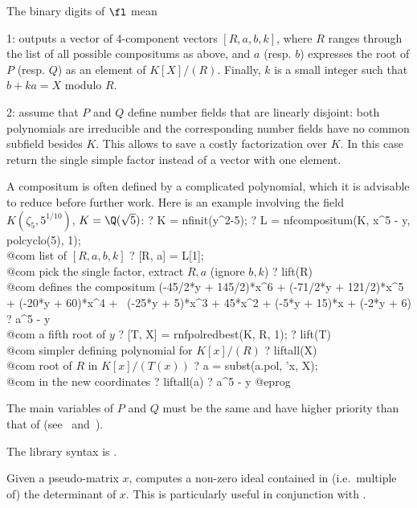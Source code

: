 The binary digits of $\fl$ mean

1: outputs a vector of 4-component vectors $[R,a,b,k]$, where $R$
ranges through the list of all possible compositums as above, and $a$
(resp. $b$) expresses the root of $P$ (resp. $Q$) as an element of
$K[X]/(R)$. Finally, $k$ is a small integer such that $b + ka = X$ modulo
$R$.

2: assume that $P$ and $Q$ define number fields that are linearly disjoint:
both polynomials are irreducible and the corresponding number fields
have no common subfield besides $K$. This allows to save a costly
factorization over $K$. In this case return the single simple factor
instead of a vector with one element.

A compositum is often defined by a complicated polynomial, which it is
advisable to reduce before further work. Here is an example involving
the field $K(\zeta_5, 5^{1/10})$, $K=\Q(\sqrt{5})$:
\bprog
? K = nfinit(y^2-5);
? L = nfcompositum(K, x^5 - y, polcyclo(5), 1); \\@com list of $[R,a,b,k]$
? [R, a] = L[1];  \\@com pick the single factor, extract $R,a$ (ignore $b,k$)
? lift(R)         \\@com defines the compositum
(-45/2*y + 145/2)*x^6 + (-71/2*y + 121/2)*x^5 + (-20*y + 60)*x^4 +    \
(-25*y + 5)*x^3 + 45*x^2 + (-5*y + 15)*x + (-2*y + 6)
? a^5 - y         \\@com a fifth root of $y$
? [T, X] = rnfpolredbest(K, R, 1);
? lift(T)     \\@com simpler defining polynomial for $K[x]/(R)$
? liftall(X)  \\ @com root of $R$ in $K[x]/(T(x))$
? a = subst(a.pol, 'x, X);  \\@com \kbd{a} in the new coordinates
? liftall(a)
? a^5 - y
@eprog

The main variables of $P$ and $Q$ must be the same and have higher priority
than that of \var{nf} (see~\kbd{varhigher} and~\kbd{varlower}).

The library syntax is .

\label{se:nfdetint}
Given a pseudo-matrix $x$, computes a
non-zero ideal contained in (i.e.~multiple of) the determinant of $x$. This
is particularly useful in conjunction with \kbd{nfhnfmod}.

